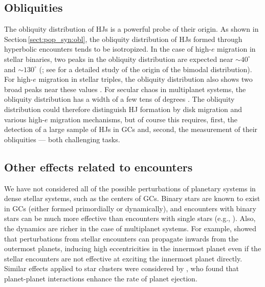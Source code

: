 \documentclass[iop,usenatbib]{emulateapj}
\renewcommand{\S}{Section}
\begin{document}
\subsection{Obliquities}
\label{sect:discussion:obl}

The obliquity distribution of HJs is a powerful probe of their origin. As shown in \S\,\ref{sect:pop_syn:obl}, the obliquity distribution of HJs formed through hyperbolic encounters tends to be isotropized. In the case of high-$e$ migration in stellar binaries, two peaks in the obliquity distribution are expected near $\sim 40^\circ$ and $\sim 130^\circ$ (\citealt{2007ApJ...669.1298F,2014ApJ...793..137N,2016MNRAS.456.3671A}; see \citealt{2017MNRAS.465.3927S} for a detailed study of the origin of the bimodal distribution). For high-$e$ migration in stellar triples, the obliquity distribution also shows two broad peaks near these values \citep{2017MNRAS.466.4107H}. For secular chaos in multiplanet systems, the obliquity distribution has a width of a few tens of degrees \citep{2014PNAS..11112610L,2017MNRAS.464..688H}. The obliquity distribution could therefore distinguish HJ formation by disk migration and various high-$e$ migration mechanisms, but of course this requires, first, the detection of a large sample of  HJs in GCs and, second, the measurement of their obliquities --- both challenging tasks. 


\subsection{Other effects related to encounters}
\label{sect:discussion:other}

We have not considered all of the possible perturbations of planetary systems in dense stellar systems, such as the centers of GCs. Binary stars are known to exist in GCs (either formed primordially or dynamically), and encounters with binary stars can be much more effective than encounters with single stars (e.g., \citealt{2015MNRAS.448..344L}). Also, the dynamics are richer in the case of multiplanet systems. For example, \citet{2004AJ....128..869Z} showed that perturbations from stellar encounters can propagate inwards from the outermost planets, inducing high eccentricities in the innermost planet even if the stellar encounters are not effective at exciting the innermost planet directly. Similar effects applied to star clusters were considered by \citet{doi:10.1093/mnras/stx1464}, who found that planet-planet interactions enhance the rate of planet ejection.
\end{document}
